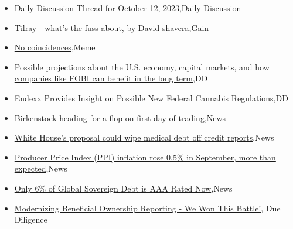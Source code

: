 \documentclass{article}%
\begin{document}
%
\begin{itemize}%
\item%
\href{https://reddit.com/r/wallstreetbets/comments/1763a0u/daily\_discussion\_thread\_for\_october\_12\_2023/}{Daily Discussion Thread for October 12, 2023},Daily Discussion%
\item%
\href{https://reddit.com/r/wallstreetbets/comments/1760zpa/tilray\_whats\_the\_fuss\_about\_by\_david\_shavera/}{Tilray - what's the fuss about, by David shavera},Gain%
\item%
\href{https://reddit.com/r/wallstreetbets/comments/175w4vq/no\_coincidences/}{No coincidences},Meme%
\item%
\href{https://reddit.com/r/Baystreetbets/comments/175ieey/possible\_projections\_about\_the\_us\_economy\_capital/}{Possible projections about the U.S. economy, capital markets, and how companies like FOBI can benefit in the long term},DD%
\item%
\href{https://reddit.com/r/Baystreetbets/comments/175emqg/endexx\_provides\_insight\_on\_possible\_new\_federal/}{Endexx Provides Insight on Possible New Federal Cannabis Regulations},DD%
\item%
\href{https://reddit.com/r/StockMarket/comments/175plwr/birkenstock\_heading\_for\_a\_flop\_on\_first\_day\_of/}{Birkenstock heading for a flop on first day of trading},News%
\item%
\href{https://reddit.com/r/Economics/comments/175fwa6/white\_houses\_proposal\_could\_wipe\_medical\_debt\_off/}{White House's proposal could wipe medical debt off credit reports},News%
\item%
\href{https://reddit.com/r/Economics/comments/175cy0n/producer\_price\_index\_ppi\_inflation\_rose\_05\_in/}{Producer Price Index (PPI) inflation rose 0.5\% in September, more than expected},News%
\item%
\href{https://reddit.com/r/Economics/comments/175bc27/only\_6\_of\_global\_sovereign\_debt\_is\_aaa\_rated\_now/}{Only 6\% of Global Sovereign Debt is AAA Rated Now},News%
\item%
\href{https://reddit.com/r/Superstonk/comments/175xr9m/modernizing\_beneficial\_ownership\_reporting\_we\_won/}{Modernizing Beneficial Ownership Reporting - We Won This Battle!}, Due Diligence%
\end{itemize}%
\end{document}
